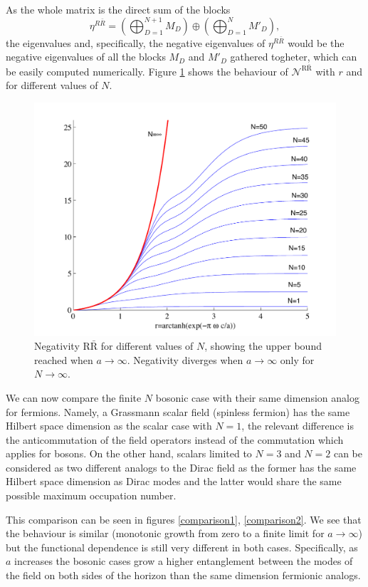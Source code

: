 As the whole matrix is the direct sum of the blocks
\begin{equation}
\eta^{R \bar R}=\left(\bigoplus_{D=1}^{N+1} M_D\right) \oplus \left(\bigoplus_{D=1}^{N} M'_D\right),
\end{equation}
the eigenvalues and, specifically, the negative eigenvalues of $\eta^{R \bar R}$ would be the negative eigenvalues of all the blocks $M_D$ and $M'_D$  gathered togheter, which can be easily computed numerically.  Figure \ref{negaRAR} shows the behaviour of $\mathcal{N}^{\text{R}{\bar{\text{R}}}}$ with $r$ and for different values of $N$.
\begin{figure}[h]
\begin{center}
\includegraphics[width=.85\textwidth]{NegaRAR}
\end{center}
\caption{ Negativity $\text{R}{\bar{\text{R}}}$ for different values of $N$, showing the upper bound reached when $a\rightarrow\infty$. Negativity diverges when $a\rightarrow\infty$ only for $N\rightarrow\infty$.}
\label{negaRAR}
\end{figure}

We can now compare the finite $N$ bosonic case with their same dimension analog for fermions. Namely, a Grassmann scalar field (spinless fermion) has the same Hilbert space dimension as the scalar case with $N=1$, the relevant difference is the anticommutation of the field operators instead of the commutation which applies for bosons. On the other hand, scalars limited to $N=3$ and $N=2$ can be considered as two different analogs to the Dirac field as the former has the same Hilbert space dimension as Dirac modes and the latter would share the same possible maximum occupation number. 

This comparison can be seen in figures \ref{comparison1}, \ref{comparison2}. We see that the behaviour is similar (monotonic growth from zero to a finite limit for $a\rightarrow\infty$) but the functional dependence is still very different in both cases. Specifically, as $a$ increases the bosonic cases grow a higher entanglement between the modes of the field on both sides of the horizon than the same dimension fermionic analogs. 

